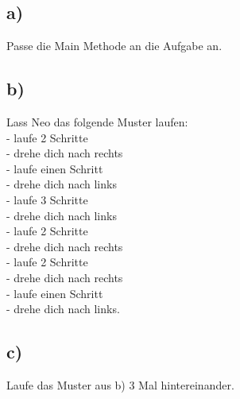 \subsection*{a)}
	Passe die Main Methode an die Aufgabe an.
\subsection*{b)}
	Lass Neo das folgende Muster laufen:\\
	- laufe 2 Schritte\\
	- drehe dich nach rechts\\
	- laufe einen Schritt\\
	- drehe dich nach links\\
	- laufe 3 Schritte\\
	- drehe dich nach links\\
	- laufe 2 Schritte\\
	- drehe dich nach rechts\\
	- laufe 2 Schritte\\
	- drehe dich nach rechts\\
	- laufe einen Schritt\\
	- drehe dich nach links.
\subsection*{c)}
	Laufe das Muster aus b) 3 Mal hintereinander.
